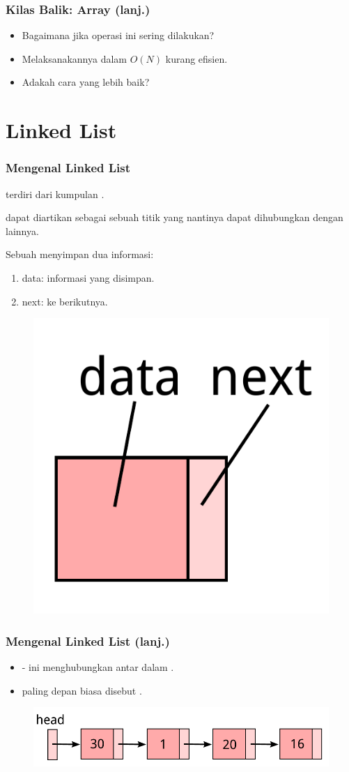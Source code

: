 \begin{frame}
\frametitle{Kilas Balik: Array (lanj.)}
\begin{itemize}
  \item Bagaimana jika operasi ini sering dilakukan?
  \item Melaksanakannya dalam $O(N)$ kurang efisien.
  \item Adakah cara yang lebih baik?
\end{itemize}
\end{frame}

\section{Linked List}
\frame{\sectionpage}

\begin{frame}
\frametitle{Mengenal Linked List}
 terdiri dari kumpulan .\newline

 dapat diartikan sebagai sebuah titik yang nantinya dapat dihubungkan dengan  lainnya.\newline

Sebuah  menyimpan dua informasi:
\begin{enumerate}
  \item data: informasi yang disimpan.
  \item next:  ke  berikutnya.
\end{enumerate}
\begin{figure}
  \centering \includegraphics[width=2 cm]{asset/singly-node.pdf}
\end{figure}

\end{frame}

\begin{frame}
\frametitle{Mengenal Linked List (lanj.)}
\begin{itemize}
  \item {}- ini menghubungkan antar  dalam .
  \item {} paling depan biasa disebut \alert{}.
\end{itemize}
\begin{figure}
  \centering \includegraphics[width=8 cm]{asset/singly-linked-list.pdf}
\end{figure}
\end{frame}

